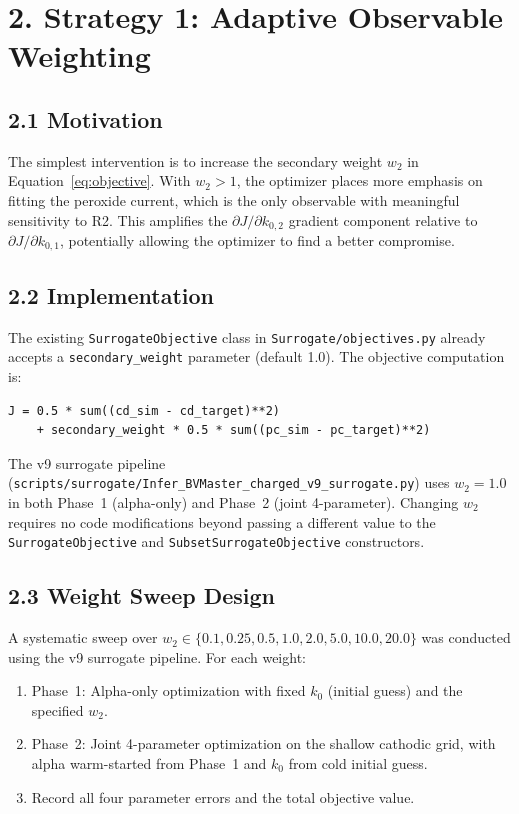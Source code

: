 \documentclass[11pt]{article}
\begin{document}
\section*{2. Strategy 1: Adaptive Observable Weighting}\label{sec:strat1}

\subsection*{2.1 Motivation}

The simplest intervention is to increase the secondary weight $w_2$ in
Equation~\eqref{eq:objective}.  With $w_2 > 1$, the optimizer places more
emphasis on fitting the peroxide current, which is the only observable with
meaningful sensitivity to R2.  This amplifies the $\partial J / \partial
k_{0,2}$ gradient component relative to $\partial J / \partial k_{0,1}$,
potentially allowing the optimizer to find a better compromise.

\subsection*{2.2 Implementation}

The existing \texttt{SurrogateObjective} class in \texttt{Surrogate/objectives.py}
already accepts a \texttt{secondary\_weight} parameter (default 1.0).  The
objective computation is:
\begin{lstlisting}
J = 0.5 * sum((cd_sim - cd_target)**2)
    + secondary_weight * 0.5 * sum((pc_sim - pc_target)**2)
\end{lstlisting}

The v9 surrogate pipeline (\texttt{scripts/surrogate/Infer\_BVMaster\_charged\_v9\_surrogate.py})
uses $w_2 = 1.0$ in both Phase~1 (alpha-only) and Phase~2 (joint 4-parameter).
Changing $w_2$ requires no code modifications beyond passing a different value
to the \texttt{SurrogateObjective} and \texttt{SubsetSurrogateObjective}
constructors.

\subsection*{2.3 Weight Sweep Design}

A systematic sweep over $w_2 \in \{0.1, 0.25, 0.5, 1.0, 2.0, 5.0, 10.0, 20.0\}$
was conducted using the v9 surrogate pipeline.  For each weight:
\begin{enumerate}
  \item Phase~1: Alpha-only optimization with fixed $k_0$ (initial guess)
        and the specified $w_2$.
  \item Phase~2: Joint 4-parameter optimization on the shallow cathodic grid,
        with alpha warm-started from Phase~1 and $k_0$ from cold initial guess.
  \item Record all four parameter errors and the total objective value.
\end{enumerate}
\end{document}
